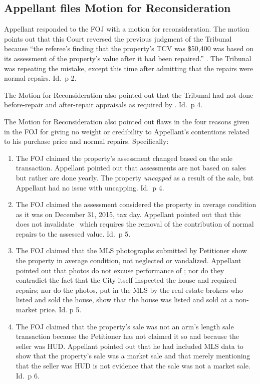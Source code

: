 \documentclass[12pt,\documentclassflag]{michiganCourtOfAppealsBrief}
\begin{document}
\subsection{Appellant files Motion for Reconsideration}

Appellant responded to the FOJ with a motion for reconsideration. The motion points out that this Court reversed the previous judgment of the Tribunal because  ``the referee's finding that the property's TCV was \$50,400 was based on its assessment of the property's value after it had been repaired.'' \motionForReconsideration[1]. The Tribunal was repeating the mistake, except this time after admitting that the repairs were normal repairs. Id.\ p 2. 

The Motion for Reconsideration also pointed out that the Tribunal had not done before-repair and after-repair appraisals as required by \mathieuGast. Id.\ p 4.

The Motion for Reconsideration also pointed out flaws in the four reasons given in the FOJ for giving no weight or credibility to Appellant's contentions related to his purchase price and normal repairs. Specifically:

\begin{enumerate}
\item The FOJ claimed the property's assessment changed based on the sale transaction. Appellant pointed out that assessments are not based on sales but rather are done yearly. The property \emph{uncapped} as a result of the sale, but Appellant had no issue with uncapping. Id.\ p 4.

\item The FOJ claimed the assessment considered the property in average condition as it was on December 31, 2015, tax day. Appellant pointed out that this does not invalidate \mathieuGast\ which requires the removal of the contribution of normal repairs to the assessed value. Id.\ p 5. 

\item The FOJ claimed that the MLS photographs submitted by Petitioner show the property in average condition, not neglected or vandalized. Appellant pointed out that photos do not excuse performance of \mathieuGast; nor do they contradict the fact that the City itself inspected the house and required repairs; nor do the photos, put in the MLS by the real estate brokers who listed and sold the house, show that the house was listed and sold at a non-market price. Id. p 5.
  
\item The FOJ claimed that the property's sale was not an arm's length sale transaction because the Petitioner has not claimed it so and because the seller was HUD. Appellant pointed out that he had included MLS data to show that the property's sale was a market sale and that merely mentioning that the seller was HUD is not evidence that the sale was not a market sale. Id.\ p 6.
\end{enumerate}
\end{document}
